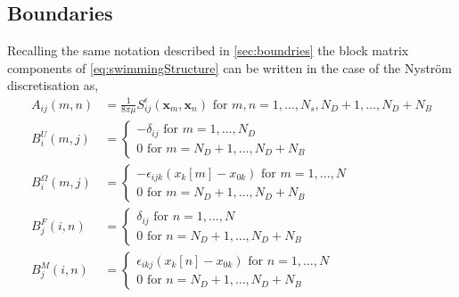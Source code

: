 \subsection{Boundaries}
Recalling the same notation described in \cref{sec:boundries} the block matrix components of \cref{eq:swimmingStructure} can be written in the case of the Nyström discretisation as,
\begin{equation*}
\begin{aligned}
A_{ij}(m,n) &= \frac{1}{8\pi\mu} S_{ij}^\epsilon (\bm{x}_m,\bm{x}_{n}) \text { for } m,n = 1,\dots,N_s,N_D+1,\dots,N_D+N_B \\
B_{i}^{U}(m,j) &= \begin{cases} -\delta_{ij} \text { for } m = 1,\dots,N_D \\ 0 \text { for } m = N_D+1,\dots,N_D+N_B\end{cases} \\
B_{i}^{\Omega}(m,j) &= \begin{cases} -\epsilon_{ijk}(x_k[m]-x_{0k}) \text { for } m = 1,\dots,N \\ 0 \text { for } m = N_D+1,\dots,N_D+N_B\end{cases} \\
B_{j}^{F}(i,n) &= \begin{cases} \delta_{ij} \text { for } n = 1,\dots,N \\ 0 \text { for } n = N_D+1,\dots,N_D+N_B\end{cases} \\
B_{j}^{M}(i,n) &= \begin{cases} \epsilon_{ikj} (x_k[n]-x_{0 k}) \text { for } n = 1,\dots,N \\ 0 \text { for } n = N_D+1,\dots,N_D+N_B\end{cases}
\end{aligned}
\end{equation*}

